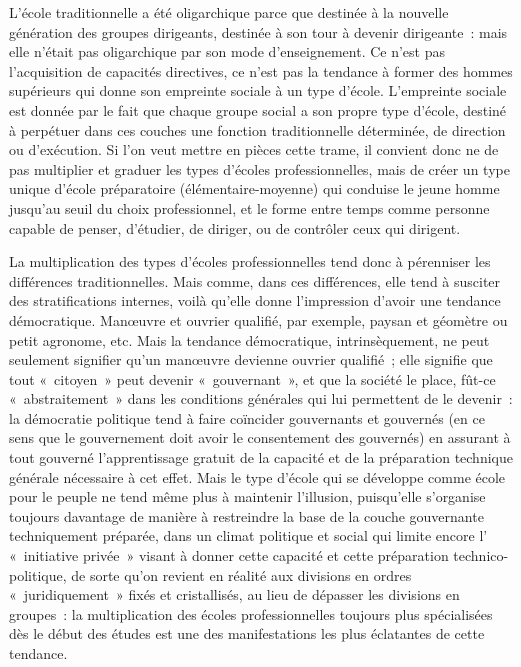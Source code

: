 \documentclass[french,twoside]{book} %
\begin{document}
L'école traditionnelle a été oligarchique parce que destinée à la nouvelle génération des groupes dirigeants, destinée à son tour à devenir dirigeante : mais elle n’était pas oligarchique par son mode d’enseignement. Ce n’est pas l’acquisition de capacités directives, ce n’est pas la tendance à former des hommes supérieurs qui donne son empreinte sociale à un type d’école. L'empreinte sociale est donnée par le fait que chaque groupe social a son propre type d’école, destiné à perpétuer dans ces couches une fonction traditionnelle déterminée, de direction ou d’exécution. Si l’on veut mettre en pièces cette trame, il convient donc ne de pas multiplier et graduer les types d’écoles professionnelles, mais de créer un type unique d’école préparatoire (élémentaire-moyenne) qui conduise le jeune homme jusqu’au seuil du choix professionnel, et le forme entre temps comme personne capable de penser, d’étudier, de diriger, ou de contrôler ceux qui dirigent.\par
La multiplication des types d’écoles professionnelles tend donc à pérenniser les différences traditionnelles. Mais comme, dans ces différences, elle tend à susciter des stratifications internes, voilà qu’elle donne l’impression d’avoir une tendance démocratique. Manœuvre et ouvrier qualifié, par exemple, paysan et géomètre ou petit agronome, etc. Mais la tendance démocratique, intrinsèquement, ne peut seulement signifier qu’un manœuvre devienne ouvrier qualifié ; elle signifie que tout « citoyen » peut devenir « gouvernant », et que la société le place, fût-ce « abstraitement » dans les conditions générales qui lui permettent de le devenir : la démocratie politique tend à faire coïncider gouvernants et gouvernés (en ce sens que le gouvernement doit avoir le consentement des gouvernés) en assurant à tout gouverné l’apprentissage gratuit de la capacité et de la préparation technique générale nécessaire à cet effet. Mais le type d’école qui se développe comme école pour le peuple ne tend même plus à maintenir l’illusion, puisqu’elle s’organise toujours davantage de manière à restreindre la base de la couche gouvernante techniquement préparée, dans un climat politique et social qui limite encore l’ « initiative privée » visant à donner cette capacité et cette préparation technico-politique, de sorte qu’on revient en réalité aux divisions en ordres « juridiquement » fixés et cristallisés, au lieu de dépasser les divisions en groupes : la multiplication des écoles professionnelles toujours plus spécialisées dès le début des études est une des manifestations les plus éclatantes de cette tendance.\par
\end{document}
